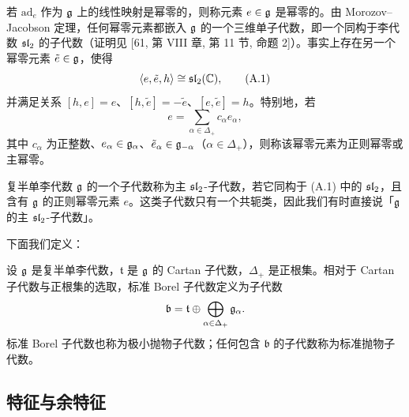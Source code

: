 若 $\mathrm{ad}_e$ 作为 $\g$ 上的线性映射是幂零的，则称元素 $e\in\g$ 是幂零的。由 Morozov–Jacobson 定理，任何幂零元素都嵌入 $\g$ 的一个三维单子代数，即一个同构于李代数 $\sl_2$ 的子代数（证明见 [61, 第 VIII 章, 第 11 节, 命题 2]）。事实上存在另一个幂零元素 $\tilde e\in\g$，使得
\begin{equation}
\langle e,\tilde e,h\rangle\cong\sl_2(\C), \tag{A.1}
\end{equation}
并满足关系 $[h,e]=e$、$[h,\tilde e]=-\tilde e$、$[e,\tilde e]=h$。特别地，若
\[
e=\sum_{\alpha\in\Delta_+}c_\alpha e_\alpha,
\]
其中 $c_\alpha$ 为正整数、$e_\alpha\in\g_\alpha$、$\tilde e_\alpha\in\g_{-\alpha}$（$\alpha\in\Delta_+$），则称该幂零元素为正则幂零或主幂零。

\begin{definition}[A.4] 复半单李代数 $\g$ 的一个子代数称为主 $\sl_2$-子代数，若它同构于 (A.1) 中的 $\sl_2$，且含有 $\g$ 的正则幂零元素 $e$。这类子代数只有一个共轭类，因此我们有时直接说「$\g$ 的主 $\sl_2$-子代数」。
\end{definition}

下面我们定义：

\begin{definition}[A.5] 设 $\g$ 是复半单李代数，$\mathfrak{t}$ 是 $\g$ 的 Cartan 子代数，$\Delta_+$ 是正根集。相对于 Cartan 子代数与正根集的选取，标准 Borel 子代数定义为子代数
\[
\mathfrak{b}=\mathfrak{t}\oplus\bigoplus_{\alpha\in\Delta_+}\g_\alpha.
\]
标准 Borel 子代数也称为极小抛物子代数；任何包含 $\mathfrak{b}$ 的子代数称为标准抛物子代数。
\end{definition}


\subsection{特征与余特征}

